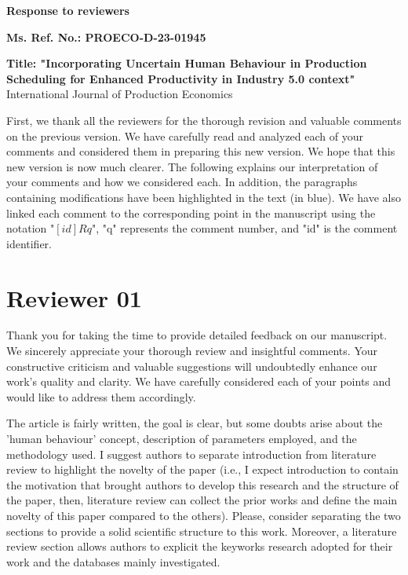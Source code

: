 \documentclass[preprint,11pt,3p]{elsarticle}
\begin{document}
\begin{center}
       \begin{huge}  
              \textbf{ \quad \quad Response to reviewers}
       \end{huge}  
       \newline
       \newline
       \textbf{Ms. Ref. No.: PROECO-D-23-01945}
                     
       \textbf{Title: "Incorporating Uncertain Human Behaviour in Production Scheduling for Enhanced Productivity in Industry 5.0 context" } 
 \newline
 International Journal of Production Economics 
       
\end{center}

First, we thank all the reviewers for the thorough revision and valuable comments on the previous version. We have carefully read and analyzed each of your comments and considered them in preparing this new version. We hope that this new version is now much clearer. The following explains our interpretation of your comments and how we considered each. In addition, the paragraphs containing modifications have been highlighted in the text (in blue). We have also linked each comment to the corresponding point in the manuscript using the notation "$[id]R{q}$",  "q" represents the comment number, and "id" is the comment identifier. 





\newpage 


\section{Reviewer 01}
Thank you for taking the time to provide detailed feedback on our manuscript. We sincerely appreciate your thorough review and insightful comments. Your constructive criticism and valuable suggestions will undoubtedly enhance our work's quality and clarity. We have carefully considered each of your points and would like to address them accordingly.


\begin{tcolorbox}[colback=q_color1,colframe=q_color2,title=Q1:] 
The article is fairly written, the goal is clear, but some doubts arise about the 'human behaviour' concept, description of parameters employed, and the methodology used.
I suggest authors to separate introduction from literature review to highlight the novelty of the paper (i.e., I expect introduction to contain the motivation that brought authors to develop this research and the structure of the paper, then, literature review can collect the prior works and define the main novelty of this paper compared to the others). Please, consider separating the two sections to provide a solid scientific structure to this work. Moreover, a literature review section allows authors to explicit the keyworks research adopted for their work and the databases mainly investigated.
\end{tcolorbox}
\end{document}
